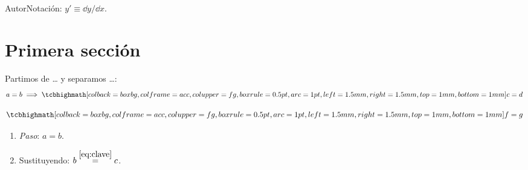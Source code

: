 \documentclass[10pt,a4paper]{article}
\newcommand{\autor}{Autor}
\begin{document}
\thispagestyle{empty}
{\small\color{muted}\autor\hfill Notación: $y'\equiv\dd y/\dd x$.}

\section{Primera sección}
Partimos de \dots{} y separamos \dots:
\begin{equation}
a=b\;\Longrightarrow\;\res{c=d}
\end{equation}

\begin{teorema}[Nombre]
\begin{equation}\label{eq:clave}
\res{f=g}
\end{equation}
\end{teorema}

\begin{demostracion}
\begin{enumerate}
\item \emph{Paso}: $a=b$.
\item Sustituyendo: $b\overset{\eqref{eq:clave}}{=}c$.
\end{enumerate}
\end{demostracion}
\end{document}
